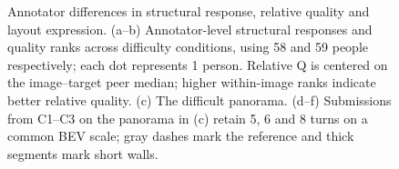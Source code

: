 \begin{figure}[t]
\centering
\setcounter{subfigure}{0}
\begin{minipage}{150mm}
\centering
{}%
\hfill%
%
\hfill%

\par\vspace{3pt}
%
\hfill%
%
\hfill%

\end{minipage}
\caption{Annotator differences in structural response, relative quality and layout expression. (a--b) Annotator-level structural responses and quality ranks across difficulty conditions, using 58 and 59 people respectively; each dot represents 1 person. Relative Q is centered on the image--target peer median; higher within-image ranks indicate better relative quality. (c) The difficult panorama. (d--f) Submissions from C1--C3 on the panorama in (c) retain 5, 6 and 8 turns on a common BEV scale; gray dashes mark the reference and thick segments mark short walls.}
\label{fig:continuous-profiles}
\label{fig:class-annotations}
\end{figure}
